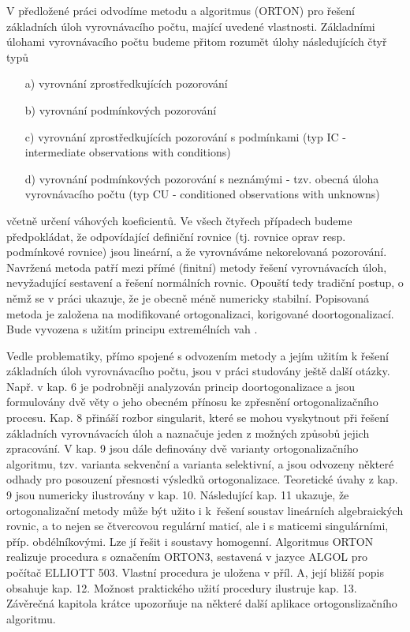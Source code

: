 V předložené práci odvodíme metodu a algoritmus (ORTON) pro
řešení základních úloh vyrovnávacího počtu, mající uvedené
vlastnosti. Základními úlohami vyrovnávacího počtu budeme
přitom rozumět úlohy následujících čtyř typů
%
\begin{itemize}
\item[a)] vyrovnání zprostředkujících pozorování

\item[b)]vyrovnání podmínkových pozorování

\item[c)] vyrovnání zprostředkujících pozorování s podmínkami
(typ IC - intermediate observations with conditions)

\item[d)] vyrovnání podmínkových pozorování s neznámými - tzv.
obecná úloha vyrovnávacího počtu (typ CU - conditioned
observations with unknowns)
\end{itemize}
%
včetně určení váhových koeficientů. Ve všech čtyřech případech
budeme předpokládat, že odpovídající definiční rovnice (tj.
rovnice oprav resp. podmínkové rovnice) jsou lineární, a že
vyrovnáváme nekorelovaná pozorování. Navržená metoda patří mezi
přímé (finitní) metody řešení vyrovnávacích úloh, nevyžadující
sestavení a řešení normálních rovnic. Opouští tedy tradiční
 postup, o němž se v práci ukazuje, že je obecně méně
numericky stabilní. Popisovaná metoda je založena na modifikované
 ortogonalizaci, korigované doortogonalizací.
Bude vyvozena s užitím principu extremélních vah
.

Vedle problematiky, přímo spojené s odvozením metody a jejím
užitím k řešení základních úloh vyrovnávacího počtu, jsou
v práci studovány ještě další otázky. Např. v kap. 6 je podrobněji
analyzován princip doortogonalizace a jsou formulovány dvě věty
o jeho obecném přínosu ke zpřesnění ortogonalizačního procesu.
Kap. 8 přináší rozbor singularit, které se mohou vyskytnout při
řešení základních vyrovnávacích úloh a naznačuje jeden z možných
způsobů jejich zpracování. V kap. 9 jsou dále definovány dvě
varianty ortogonalizačního algoritmu, tzv. varianta sekvenční a
varianta selektivní, a jsou odvozeny některé odhady pro posouzení
přesnosti výsledků ortogonalizace. Teoretické úvahy z kap. 9
%
%
jsou numericky ilustrovány v kap. 10.
Následující kap. 11
ukazuje, že ortogonalizační metody může být užito i k~řešení
soustav lineárních algebraických rovnic, a to nejen se čtvercovou
regulární maticí, ale i s maticemi singulárními, příp.
obdélníkovými. Lze jí řešit i soustavy homogenní. Algoritmus ORTON
realizuje procedura s označením ORTON3, sestavená v jazyce
ALGOL pro počítač ELLIOTT 503. Vlastní procedura je uložena v
příl. A, její bližší popis obsahuje kap. 12. Možnost praktického
užití procedury ilustruje kap. 13. Závěrečná kapitola
krátce upozorňuje na některé další aplikace ortogonslizačního
algoritmu.

